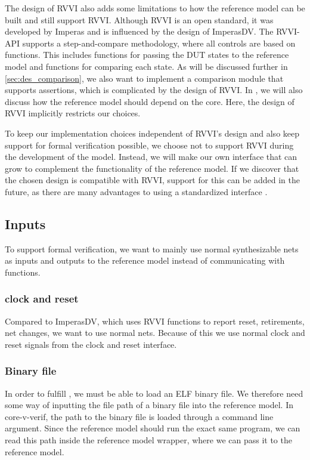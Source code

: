 The design of RVVI also adds some limitations to how the reference model can be built and still support RVVI. Although RVVI is an open standard, it was developed by Imperas and is influenced by the design of ImperasDV. The RVVI-API supports a step-and-compare methodology, where all controls are based on functions. This includes functions for passing the DUT states to the reference model and functions for comparing each state\cite{riscv-verificationRISCVVerificationInterface2023}. As will be discussed further in \ref{sec:des_comparison}, we also want to implement a comparison module that supports assertions, which is complicated by the design of RVVI. 
In , we will also discuss how the reference model should depend on the core. Here, the design of RVVI implicitly restricts our choices. 

To keep our implementation choices independent of RVVI's design and also keep support for formal verification possible, we choose not to support RVVI during the development of the model. Instead, we will make our own interface that can grow to complement the functionality of the reference model. If we discover that the chosen design is compatible with RVVI, support for this can be added in the future, as there are many advantages to using a standardized interface \cite{riscv-verificationRISCVVerificationInterface2023}.


\subsection{Inputs}

To support formal verification, we want to mainly use normal synthesizable nets as inputs and outputs to the reference model instead of communicating with functions.

\subsubsection{clock and reset}

Compared to ImperasDV, which uses RVVI functions to report reset, retirements, net changes, we want to use normal nets. Because of this we use normal clock and reset signals from the  clock and reset interface. 

\subsubsection{Binary file}
In order to fulfill , we must be able to load an ELF binary file. We therefore need some way of inputting the file path of a binary file into the reference model. In core-v-verif, the path to the binary file is loaded through a command line argument. Since the reference model should run the exact same program, we can read this path inside the reference model wrapper, where we can pass it to the reference model.

